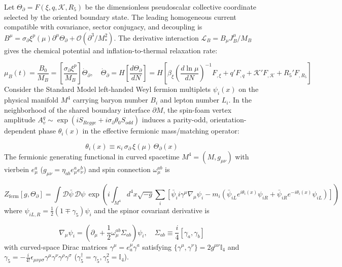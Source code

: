 \documentclass[aps,prd,onecolumn,superscriptaddress,nofootinbib,longbibliography,10pt]{revtex4-2}
\begin{document}
  Let \(\Theta_\partial = F(\xi,q,\mathcal{K},R_5)\) be the dimensionless pseudoscalar collective coordinate selected by the oriented boundary state. The leading homogeneous current compatible with covariance, sector conjugacy, and decoupling is \(B^\mu = \sigma_\partial\xi^p(\mu)\partial^\mu\Theta_\partial + \mathcal{O}(\partial^3/M_*^2)\). The derivative interaction \(\mathcal{L}_B = B_\mu J_B^\mu / M_B\) gives the chemical potential and inflation-to-thermal relaxation rate:


  \[ \mu_B(t) = \frac{B_0}{M_B} = \left[\frac{\sigma_\partial\xi^p}{M_B}\right]\dot{\Theta}_\partial, \quad \dot{\Theta}_\partial = H\left[\frac{d\Theta_\partial}{dN}\right] = H\left[ \beta_\xi\left(\frac{d\ln\mu}{dN}\right)^{-1}F_{,\xi} + q'F_{,q} + \mathcal{K}'F_{,\mathcal{K}} + R_5'F_{,R_5} \right] \]
  Consider the Standard Model left-handed Weyl fermion multiplets \(\psi_i(x)\) on the physical manifold \(M^4\) carrying baryon number \(B_i\) and lepton number \(L_i\). In the neighborhood of the shared boundary interface \(\partial M\), the spin-foam vertex amplitude \(A_v^q \sim \exp(iS_{Regge} + i\sigma_\partial\theta_0 S_{odd})\) induces a parity-odd, orientation-dependent phase \(\theta_i(x)\) in the effective fermionic mass/matching operator:


  \[ \theta_i(x) \equiv \kappa_i\,\sigma_\partial\,\xi(\mu)\,\Theta_\partial(x) \]
  The fermionic generating functional in curved spacetime \(M^4 = (M, g_{\mu\nu})\) with vierbein \(e_\mu^a\) (\(g_{\mu\nu} = \eta_{ab}e_\mu^a e_\nu^b\)) and spin connection \(\omega_\mu^{ab}\) is


  \[ Z_{\text{ferm}}[g,\Theta_\partial] = \int \mathcal{D}\bar{\psi}\,\mathcal{D}\psi\,\exp\left( i\int_{M^4} d^4x\sqrt{-g}\sum_i \left[ \bar{\psi}_i i\gamma^\mu\nabla_\mu\psi_i - m_i\left(\bar{\psi}_{iL}e^{i\theta_i(x)}\psi_{iR} + \bar{\psi}_{iR}e^{-i\theta_i(x)}\psi_{iL}\right) \right] \right) \]
  where \(\psi_{iL,R} = \frac{1}{2}(1 \mp \gamma_5)\psi_i\) and the spinor covariant derivative is


  \[ \nabla_\mu\psi_i = \left(\partial_\mu + \frac{1}{2}\omega_\mu^{ab}\Sigma_{ab}\right)\psi_i, \quad \Sigma_{ab} \equiv \frac{i}{4}[\gamma_a, \gamma_b] \]
  with curved-space Dirac matrices \(\gamma^\mu = e_a^\mu\gamma^a\) satisfying \(\{\gamma^\mu, \gamma^\nu\} = 2g^{\mu\nu}\mathbb{I}_4\) and \(\gamma_5 = -\frac{i}{4!}\epsilon_{\mu\nu\rho\sigma}\gamma^\mu\gamma^\nu\gamma^\rho\gamma^\sigma\) (\(\gamma_5^\dagger = \gamma_5, \gamma_5^2 = \mathbb{I}_4\)).
\end{document}
